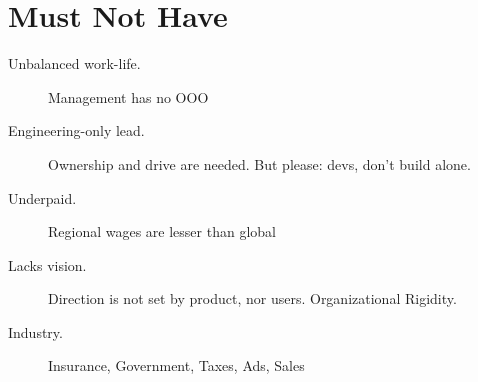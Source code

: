 \section*{Must Not Have}

\begin{description}
  \item[Unbalanced work-life.] Management has no OOO
  \item[Engineering-only lead.]
  Ownership and drive are needed.
  But please: %
  devs, don't build alone.
 \item[Underpaid.] Regional wages are lesser than global
 \item[Lacks vision.] Direction is not set by product, nor users. Organizational Rigidity.
  \item[Industry.] Insurance, Government, Taxes, Ads, Sales %
\end{description}



% 


